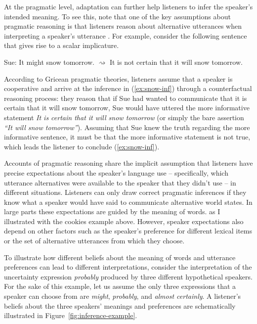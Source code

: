 At the pragmatic level, adaptation can further help listeners to infer the speaker's intended meaning. To see this, note that one of the key assumptions about pragmatic reasoning is that listeners reason about alternative utterances when interpreting a speaker's utterance \cite{Grice1975, Horn1984}. For example, consider the following sentence that gives rise to a scalar implicature.

\begin{exe}
\ex Sue: It might snow tomorrow.
\ex \label{ex:snow-inf} $\rightsquigarrow$  It is not certain that it will snow tomorrow.
\end{exe}

According to Gricean pragmatic theories, listeners assume that a speaker is cooperative and arrive at the inference in (\ref{ex:snow-inf}) through a counterfactual reasoning process: they reason that if Sue had wanted to communicate that it is certain that it will snow tomorrow, Sue would have uttered the more informative statement \textit{It is certain that it will snow tomorrow} (or simply the bare assertion \emph{``It will snow tomorrow''}). Assuming that Sue knew the truth regarding the more informative sentence, it must be that the more informative statement is not true, which leads the listener to conclude (\ref{ex:snow-inf}). 

Accounts of pragmatic reasoning share the implicit assumption that listeners have precise expectations
 about the speaker's language use -- specifically, which utterance alternatives were available to the 
 speaker that they didn't use -- in different situations. Listeners can only draw correct pragmatic 
 inferences if they know what a speaker would have said to communicate alternative world states. 
 In large parts these expectations are guided by the meaning of words. as I illustrated with the cookies example above. 
However, speaker expectations also depend on other factors such as the speaker's preference for
 different lexical items or the set of alternative utterances from which they choose.
 
To illustrate how different beliefs about the meaning of words and utterance preferences can lead to different interpretations, consider the interpretation 
of the uncertainty expression \textit{probably} produced by three different hypothetical speakers. For the sake of this example, 
let us assume the only three expressions that a speaker can choose from are \textit{might}, \textit{probably}, and \textit{almost certainly}.
A listener's beliefs about the three speakers' meanings and preferences are schematically illustrated in Figure~\ref{fig:inference-example}.

